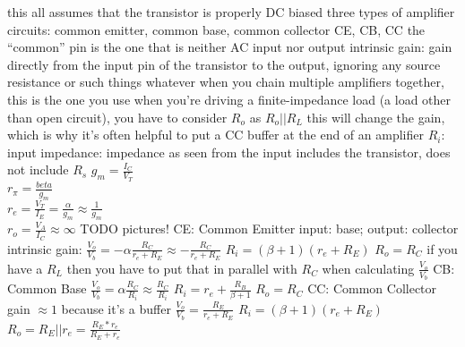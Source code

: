 \documentclass[12pt]{article}
\begin{document}
\begin{spacing}{0.8}
\begin{multicols*}{2}
\begin{flushleft}
\begin{outline}[longenum]
  \1 this all assumes that the transistor is properly DC biased
  \1 three types of amplifier circuits: common emitter, common base, common collector
    \2 CE, CB, CC
    \2 the ``common'' pin is the one that is neither AC input nor output
  \1 intrinsic gain: gain directly from the input pin of the transistor to the output, ignoring any source resistance or such things whatever
    \2 when you chain multiple amplifiers together, this is the one you use
  \1 when you're driving a finite-impedance load (a load other than open circuit), you have to consider $R_o$ as $R_o||R_L$
    \2 this will change the gain, which is why it's often helpful to put a CC buffer at the end of an amplifier
  \1 $R_i$: input impedance: impedance as seen from the input
    \2 includes the transistor, does not include $R_s$
  \1 $g_m = \frac{I_C}{V_T}$
  \\ $r_\pi = \frac{beta}{g_m}$
  \\ $r_e = \frac{V_T}{I_E} = \frac{\alpha}{g_m} \approx \frac{1}{g_m}$
  \\ $r_o = \frac{V_A}{I_C} \approx \infty$
  \1 TODO pictures!
  \1 CE: Common Emitter
    \2 input: base; output: collector
    \2 intrinsic gain: $\frac{V_o}{V_b}= -\alpha\frac{R_C}{r_e + R_E} \approx -\frac{R_C}{r_e + R_E}$
    \2 $R_i=(\beta+1)(r_e+R_E)$
    \2 $R_o = R_C$
    \2 if you have a $R_L$ then you have to put that in parallel with $R_C$ when calculating $\frac{V_o}{V_b}$
  \1 CB: Common Base
    \2 $\frac{V_o}{V_b} = \alpha\frac{R_C}{R_i} \approx \frac{R_C}{R_i}$
    \2 $R_i = r_e + \frac{R_B}{\beta+1}$
    \2 $R_o=R_C$
  \1 CC: Common Collector
    \2 gain $\approx 1$ because it's a buffer
    \2 $\frac{V_o}{V_b} = \frac{R_E}{r_e+R_E}$
    \2 $R_i = (\beta+1)(r_e+R_E)$
    \2 $R_o = R_E||r_e = \frac{R_E*r_e}{R_E+r_e}$




\end{outline}
\end{flushleft}
\end{multicols*}
\end{spacing}
\end{document}
